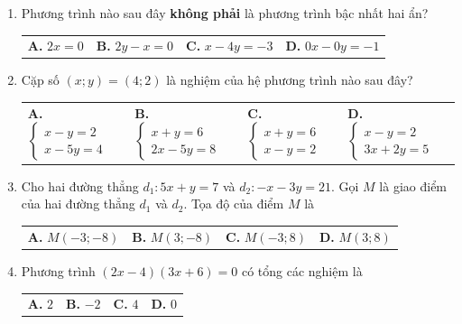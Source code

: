 \documentclass[12pt,a4paper]{article}
\begin{document}
\begin{enumerate}[label=\textbf{Câu \arabic*.}, leftmargin=*, itemsep=3.5pt, parsep=0pt]
  \item Phương trình nào sau đây \textbf{không phải} là phương trình bậc nhất hai ẩn?
  \begin{flushleft}
    \begin{tabularx}{\linewidth}{X X X X}
      \textbf{A.} $2x = 0$ & 
      \textbf{B.} $2y - x = 0$ & 
      \textbf{C.} $x - 4y = -3$ & 
      \textbf{D.} $0x - 0y = -1$
    \end{tabularx}
  \end{flushleft}

  \item Cặp số $(x; y) = (4; 2)$ là nghiệm của hệ phương trình nào sau đây?
  \begin{flushleft}
    \begin{tabularx}{\linewidth}{X X X X}
      \textbf{A.} $\begin{cases} x - y = 2 \\ x - 5y = 4 \end{cases}$ & 
      \textbf{B.} $\begin{cases} x + y = 6 \\ 2x - 5y = 8 \end{cases}$ & 
      \textbf{C.} $\begin{cases} x + y = 6 \\ x - y = 2 \end{cases}$ & 
      \textbf{D.} $\begin{cases} x - y = 2 \\ 3x + 2y = 5 \end{cases}$
    \end{tabularx}
  \end{flushleft}

  \item Cho hai đường thẳng $d_1: 5x + y = 7$ và $d_2: -x - 3y = 21$. Gọi $M$ là giao điểm của hai đường thẳng $d_1$ và $d_2$. Tọa độ của điểm $M$ là
  \begin{flushleft}
    \begin{tabularx}{\linewidth}{X X X X}
      \textbf{A.} $M(-3; -8)$ & 
      \textbf{B.} $M(3; -8)$ & 
      \textbf{C.} $M(-3; 8)$ & 
      \textbf{D.} $M(3; 8)$
    \end{tabularx}
  \end{flushleft}

  \item Phương trình $(2x - 4)(3x + 6) = 0$ có tổng các nghiệm là
  \begin{flushleft}
    \begin{tabularx}{\linewidth}{X X X X}
      \textbf{A.} $2$ & 
      \textbf{B.} $-2$ & 
      \textbf{C.} $4$ & 
      \textbf{D.} $0$
    \end{tabularx}
  \end{flushleft}


\end{enumerate}
\end{document}

